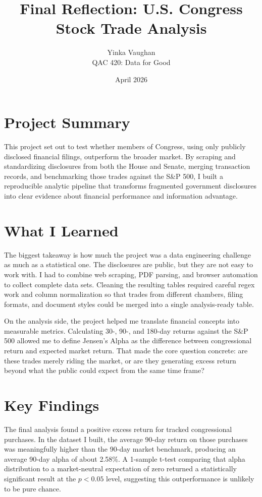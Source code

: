 \documentclass[12pt]{article}
\title{Final Reflection: U.S. Congress Stock Trade Analysis}
\author{Yinka Vaughan \\ QAC 420: Data for Good}
\date{April 2026}
\begin{document}
\maketitle
\doublespacing

\section*{Project Summary}
This project set out to test whether members of Congress, using only publicly disclosed financial filings, outperform the broader market. By scraping and standardizing disclosures from both the House and Senate, merging transaction records, and benchmarking those trades against the S\&P 500, I built a reproducible analytic pipeline that transforms fragmented government disclosures into clear evidence about financial performance and information advantage.

\section*{What I Learned}
The biggest takeaway is how much the project was a data engineering challenge as much as a statistical one. The disclosures are public, but they are not easy to work with. I had to combine web scraping, PDF parsing, and browser automation to collect complete data sets. Cleaning the resulting tables required careful regex work and column normalization so that trades from different chambers, filing formats, and document styles could be merged into a single analysis-ready table.

On the analysis side, the project helped me translate financial concepts into measurable metrics. Calculating 30-, 90-, and 180-day returns against the S\&P 500 allowed me to define Jensen's Alpha as the difference between congressional return and expected market return. That made the core question concrete: are these trades merely riding the market, or are they generating excess return beyond what the public could expect from the same time frame?

\section*{Key Findings}
The final analysis found a positive excess return for tracked congressional purchases. In the dataset I built, the average 90-day return on those purchases was meaningfully higher than the 90-day market benchmark, producing an average 90-day alpha of about 2.58\%. A 1-sample t-test comparing that alpha distribution to a market-neutral expectation of zero returned a statistically significant result at the $p < 0.05$ level, suggesting this outperformance is unlikely to be pure chance.
\end{document}

